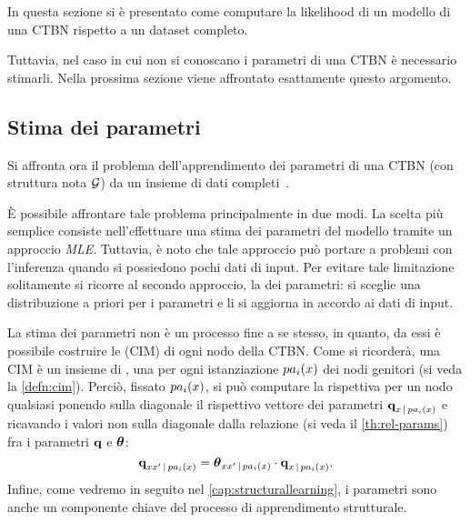 In questa sezione si è presentato come computare la likelihood di un modello di una \acs{CTBN} rispetto a un dataset completo.

Tuttavia, nel caso in cui non si conoscano i parametri di una \acs{CTBN} è necessario stimarli. Nella prossima sezione viene affrontato esattamente questo argomento.

\subsection{Stima dei parametri}\label{subsec:ctbn-params}
Si affronta ora il problema dell'apprendimento dei parametri di una \acl{CTBN} (con struttura nota $\mathcal{G}$) da un insieme di dati completi~\citep[si veda][sezione 5.1]{Nodelman2007}.

\`E possibile affrontare tale problema principalmente in due modi. La scelta più semplice consiste nell'effettuare una stima dei parametri del modello tramite un approccio \emph{\acl{MLE}}. Tuttavia, è noto che tale approccio può portare a problemi con l'inferenza quando si possiedono pochi dati di input. Per evitare tale limitazione solitamente si ricorre al secondo approccio, la \emph{} dei parametri: si sceglie una distribuzione a priori per i parametri e li si aggiorna in accordo ai dati di input.

La stima dei parametri non è un processo fine a se stesso, in quanto,  da essi è possibile costruire le \cim{} (\acs{CIM}) di ogni nodo della \acs{CTBN}. Come si ricorderà, una \acs{CIM} è un insieme di \im{}, una per ogni istanziazione $pa_i(\mathnormal{x})$ dei nodi genitori (si veda la \autoref{defn:cim}). Perciò, fissato $pa_i(\mathnormal{x})$, si può computare la rispettiva \im*{} per un nodo qualsiasi ponendo sulla diagonale il rispettivo vettore dei parametri $\boldsymbol{\textbf{\text{q}}}_{\mathnormal{x}\,\arrowvert\,pa_i(\mathnormal{x})}$ e ricavando i valori non sulla diagonale dalla relazione (si veda il \autoref{th:rel-params}) fra i parametri $\boldsymbol{\textbf{\text{q}}}$ e $\boldsymbol{\textbf{\text{$\theta$}}}$:
\begin{equation}
\label{eq:ctbn-params-rel}
\boldsymbol{\textbf{\text{q}}}_{\mathnormal{x}\mathnormal{x}^\prime\,\arrowvert\,pa_i(\mathnormal{x})}=\boldsymbol{\textbf{\text{$\theta$}}}_{\mathnormal{x}\mathnormal{x}^\prime\,\arrowvert\,pa_i(\mathnormal{x})} \cdot \boldsymbol{\textbf{\text{q}}}_{\mathnormal{x}\,\arrowvert\,pa_i(\mathnormal{x})}\text{.}
\end{equation}
Infine, come vedremo in seguito nel \autoref{cap:structurallearning}, i parametri sono anche un componente chiave del processo di apprendimento strutturale.

